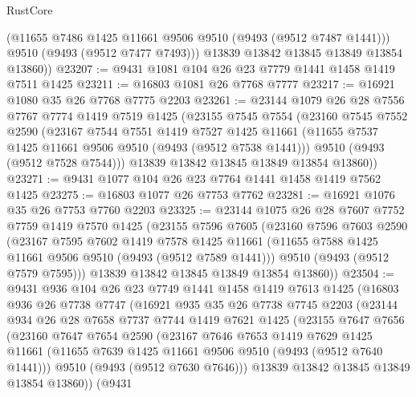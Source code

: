 \begin{lexlean}{RustCore}
\begin{coremodule}
          (@11655 @7486 @1425 @11661 @9506 @9510 (@9493 (@9512 @7487 @1441)))
          @9510
          (@9493 (@9512 @7477 @7493)))
        @13839
        @13842
        @13845
        @13849
        @13854
        @13860))
@23207 := @9431 @1081 @104 @26 @23 @7779 @1441 @1458 @1419 @7511 @1425
@23211 := @16803 @1081 @26 @7768 @7777
@23217 := @16921 @1080 @35 @26 @7768 @7775 @2203
@23261 := @23144
    @1079
    @26
    @28
    @7556
    @7767
    @7774
    @1419
    @7519
    @1425
    (@23155
      @7545
      @7554
      (@23160
        @7545
        @7552
        @2590
        (@23167
          @7544
          @7551
          @1419
          @7527
          @1425
          @11661
          (@11655 @7537 @1425 @11661 @9506 @9510 (@9493 (@9512 @7538 @1441)))
          @9510
          (@9493 (@9512 @7528 @7544)))
        @13839
        @13842
        @13845
        @13849
        @13854
        @13860))
@23271 := @9431 @1077 @104 @26 @23 @7764 @1441 @1458 @1419 @7562 @1425
@23275 := @16803 @1077 @26 @7753 @7762
@23281 := @16921 @1076 @35 @26 @7753 @7760 @2203
@23325 := @23144
    @1075
    @26
    @28
    @7607
    @7752
    @7759
    @1419
    @7570
    @1425
    (@23155
      @7596
      @7605
      (@23160
        @7596
        @7603
        @2590
        (@23167
          @7595
          @7602
          @1419
          @7578
          @1425
          @11661
          (@11655 @7588 @1425 @11661 @9506 @9510 (@9493 (@9512 @7589 @1441)))
          @9510
          (@9493 (@9512 @7579 @7595)))
        @13839
        @13842
        @13845
        @13849
        @13854
        @13860))
@23504 := @9431
    @936
    @104
    @26
    @23
    @7749
    @1441
    @1458
    @1419
    @7613
    @1425
    (@16803
      @936
      @26
      @7738
      @7747
      (@16921
        @935
        @35
        @26
        @7738
        @7745
        @2203
        (@23144
          @934
          @26
          @28
          @7658
          @7737
          @7744
          @1419
          @7621
          @1425
          (@23155
            @7647
            @7656
            (@23160
              @7647
              @7654
              @2590
              (@23167
                @7646
                @7653
                @1419
                @7629
                @1425
                @11661
                (@11655 @7639 @1425 @11661 @9506 @9510 (@9493 (@9512 @7640 @1441)))
                @9510
                (@9493 (@9512 @7630 @7646)))
              @13839
              @13842
              @13845
              @13849
              @13854
              @13860))
          (@9431

\end{coremodule}
\end{lexlean}
